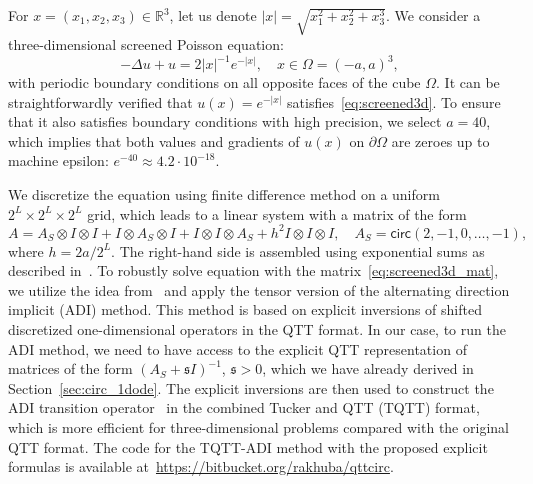 \documentclass[a4paper]{article}
\newcommand{\shift}{\mathfrak{s}}
\begin{document}
{\color{blue}
For $x = (x_1,x_2,x_3) \in \mathbb{R}^3$, let us denote $|x|= \sqrt{x_1^2+x_2^2 + x_3^3}$. 
We consider a three-dimensional screened Poisson equation:
\begin{equation}\label{eq:screened3d}
    -\Delta u + u = 2|x|^{-1} e^{-|x|}, \quad x  \in \Omega = (-a,a)^3,
\end{equation}
with periodic boundary conditions on all opposite faces of the cube $\Omega$. 
It can be straightforwardly verified that $u(x)= e^{-|x|}$ satisfies~\eqref{eq:screened3d}.
To ensure that it also satisfies boundary conditions with high precision, we select $a = 40$, which implies that both values and gradients of $u(x)$ on $\partial \Omega$  are zeroes up to machine epsilon: $e^{-40} \approx 4.2 \cdot 10^{-18}$. 

We discretize the equation using finite difference method on a uniform $2^L \times 2^L \times 2^L$ grid, which leads to a linear system with a matrix of the form
\begin{equation}\label{eq:screened3d_mat}
    A = A_S \otimes I \otimes I + I \otimes A_S \otimes I + I \otimes I \otimes A_S + h^2 I \otimes I \otimes I, \quad A_S = \mathsf{circ}(2, -1, 0, \dots, -1),
\end{equation}
where $h = 2a/2^{L}$. The right-hand side is assembled using exponential sums as described in~\cite{rakhuba2021robust}. To robustly solve equation with the matrix~\eqref{eq:screened3d_mat}, we utilize the idea from~\cite{rakhuba2021robust} and apply the tensor version of the alternating direction implicit (ADI) method. 
This method is based on explicit inversions of shifted discretized one-dimensional operators in the QTT format.
In our case, to run the ADI method, we need to have access to the explicit QTT representation of matrices of the form $(A_S + \shift I)^{-1}$, $\shift>0$, which we have already derived in Section~\ref{sec:circ_1dode}.
The explicit inversions are then used to construct the ADI transition operator~\cite{rakhuba2021robust} in the combined Tucker and QTT (TQTT) format, which is more efficient for three-dimensional problems compared with the original QTT format.
The code for the TQTT-ADI method with the proposed explicit formulas is available at~\url{https://bitbucket.org/rakhuba/qttcirc}.

}
\end{document}
